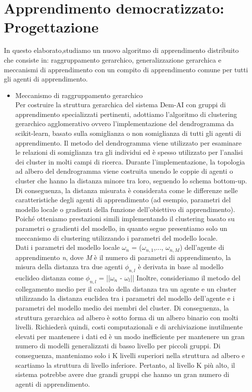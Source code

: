 \chapter{Apprendimento democratizzato: Progettazione}\label{ch:chapter2}
In questo elaborato,studiamo un nuovo algoritmo di apprendimento distribuito che consiste in: raggruppamento gerarchico, generalizzazione gerarchica e meccanismi di apprendimento con un compito di apprendimento comune per tutti gli agenti di apprendimento.

\begin{itemize}

\item Meccanismo di raggruppamento gerarchico\\

Per costruire la struttura gerarchica del sistema Dem-AI con gruppi di apprendimento specializzati pertinenti, adottiamo l'algoritmo di clustering gerarchico agglomerativo ovvero l'implementazione del dendrogramma da scikit-learn, basato sulla somiglianza o non somiglianza di tutti gli agenti di apprendimento.
Il metodo del dendrogramma viene utilizzato per esaminare le relazioni di somiglianza tra gli individui ed è spesso utilizzato per l'analisi dei cluster in molti campi di ricerca. Durante l'implementazione, la topologia ad albero del dendrogramma viene costruita unendo le coppie di agenti o cluster che hanno la distanza minore tra loro, seguendo lo schema bottom-up. Di conseguenza, la distanza misurata è considerata come le differenze nelle caratteristiche degli agenti di apprendimento (ad esempio, parametri del modello locale o gradienti della funzione dell'obiettivo di apprendimento). Poiché otteniamo prestazioni simili implementando il clustering basato su parametri o gradienti del modello, in quanto segue presentiamo solo un meccanismo di clustering utilizzando i parametri del modello locale. \\
Dati i parametri del modello locale $\omega_n$ = ($\omega_{n,1}$,..., $\omega_{n,M}$) dell'agente di apprendimento \textsl{n}, dove \textsl{M} è il numero di parametri di apprendimento, la misura della distanza tra due agenti $\phi_{n,l}$ è derivata in base al modello euclideo distanza come $\phi_{n,l}$ =  ||$\omega_n$ - $\omega_l$|| 
Inoltre, consideriamo il metodo del collegamento medio per il calcolo della distanza tra un agente e un cluster utilizzando la distanza euclidea tra i parametri del modello dell'agente e i parametri del modello medio dei membri del cluster.
Di conseguenza, la struttura gerarchica ad albero è sotto forma di un albero binario con molti livelli. Richiederà quindi, costi computazionali e di archiviazione inutilmente elevati per mantenere i dati ed è un modo inefficiente per mantenere un gran numero di modelli generalizzati di basso livello per piccoli gruppi. Di conseguenza, manteniamo solo i K livelli superiori nella struttura ad albero e scartiamo la struttura di livello inferiore. Pertanto, al livello K più alto, il sistema potrebbe avere due grandi gruppi che hanno un gran numero di agenti di apprendimento.



\end{itemize}

